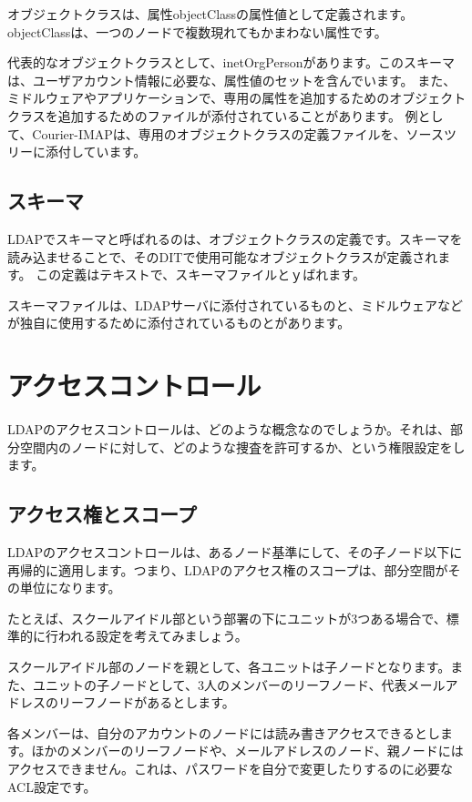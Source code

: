 オブジェクトクラスは、属性objectClassの属性値として定義されます。objectClassは、一つのノードで複数現れてもかまわない属性です。

代表的なオブジェクトクラスとして、inetOrgPersonがあります。このスキーマは、ユーザアカウント情報に必要な、属性値のセットを含んでいます。
また、ミドルウェアやアプリケーションで、専用の属性を追加するためのオブジェクトクラスを追加するためのファイルが添付されていることがあります。
例として、Courier-IMAPは、専用のオブジェクトクラスの定義ファイルを、ソースツリーに添付しています。


\subsection{スキーマ}
LDAPでスキーマと呼ばれるのは、オブジェクトクラスの定義です。スキーマを読み込ませることで、そのDITで使用可能なオブジェクトクラスが定義されます。
この定義はテキストで、スキーマファイルとｙばれます。

スキーマファイルは、LDAPサーバに添付されているものと、ミドルウェアなどが独自に使用するために添付されているものとがあります。

\section{アクセスコントロール}

LDAPのアクセスコントロールは、どのような概念なのでしょうか。それは、部分空間内のノードに対して、どのような捜査を許可するか、という権限設定をします。

\subsection{アクセス権とスコープ}

LDAPのアクセスコントロールは、あるノード基準にして、その子ノード以下に再帰的に適用します。つまり、LDAPのアクセス権のスコープは、部分空間がその単位になります。

たとえば、スクールアイドル部という部署の下にユニットが3つある場合で、標準的に行われる設定を考えてみましょう。

スクールアイドル部のノードを親として、各ユニットは子ノードとなります。また、ユニットの子ノードとして、3人のメンバーのリーフノード、代表メールアドレスのリーフノードがあるとします。

各メンバーは、自分のアカウントのノードには読み書きアクセスできるとします。ほかのメンバーのリーフノードや、メールアドレスのノード、親ノードにはアクセスできません。これは、パスワードを自分で変更したりするのに必要なACL設定です。

